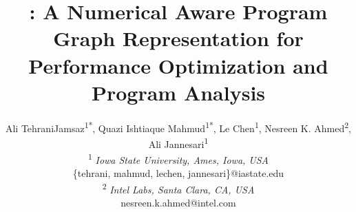 \documentclass{article}
\title{\ourtool: A Numerical Aware Program Graph Representation for Performance Optimization and Program Analysis}
\author{%
  Ali TehraniJamsaz\textsuperscript{1*}, Quazi Ishtiaque Mahmud\textsuperscript{1*}, Le Chen\textsuperscript{1}, Nesreen K. Ahmed\textsuperscript{2}, Ali Jannesari\textsuperscript{1}\\
  \textsuperscript{1} \textit{Iowa State University, Ames, Iowa, USA}\\
  \{tehrani, mahmud, lechen, jannesari\}@iastate.edu \\
  \textsuperscript{2} \textit{Intel Labs, Santa Clara, CA, USA}\\
  nesreen.k.ahmed@intel.com
}
\begin{document}
\newcommand{\programl}{\textsc{ProGraML}\xspace}
\newcommand{\ourtool}{\textsc{Perfograph}\xspace}
\newcommand\TODO[1]{\noindent{\color{blue} {\bf \fbox{TODO}} {\it#1}}}



\maketitle
\def\thefootnote{*}

\vspace{-10pt}
\begin{abstract}

\end{abstract}







%

%



% 
% 
{\small


}











\end{document}
